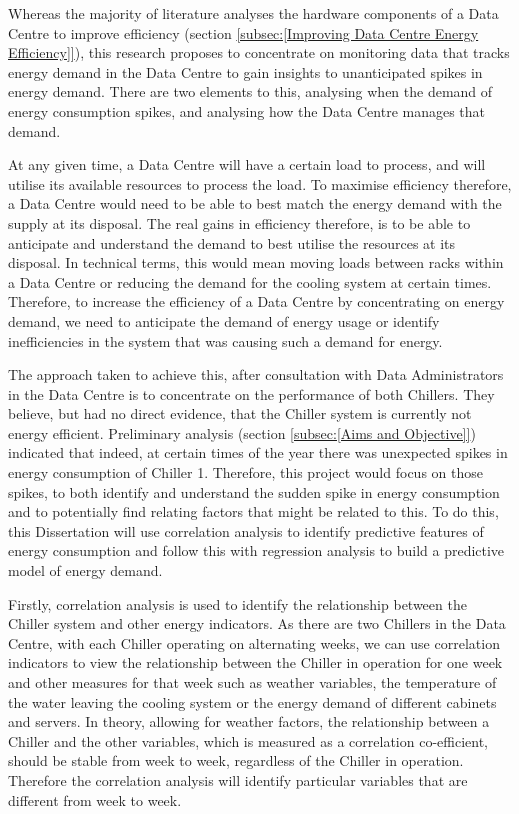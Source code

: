 \documentclass[12pt]{scrartcl}
\begin{document}
 

Whereas the majority of literature analyses the hardware components of a Data Centre to improve efficiency (section \ref{subsec:[Improving Data Centre Energy Efficiency]}), this research proposes to concentrate on monitoring data that tracks energy demand in the Data Centre to gain insights to unanticipated spikes in energy demand. There are two elements to this, analysing when the demand of energy consumption spikes, and analysing how the Data Centre manages that demand. 

 

At any given time, a Data Centre will have a certain load to process, and will utilise its available resources to process the load. To maximise efficiency therefore, a Data Centre would need to be able to best match the energy demand with the supply at its disposal. The real gains in efficiency therefore, is to be able to anticipate and understand the demand to best utilise the resources at its disposal. In technical terms, this would mean moving loads between racks within a Data Centre or reducing the demand for the cooling system at certain times. Therefore, to increase the efficiency of a Data Centre by concentrating on energy demand, we need to anticipate the demand of energy usage or identify inefficiencies in the system that was causing such a demand for energy.

 

The approach taken to achieve this, after consultation with Data Administrators in the Data Centre is to concentrate on the performance of both Chillers. They believe, but had no direct evidence, that the Chiller system is currently not energy efficient. Preliminary analysis (section \ref{subsec:[Aims and Objective]}) indicated that indeed, at certain times of the year there was unexpected spikes in energy consumption of Chiller 1. Therefore, this project would focus on those spikes, to both identify and understand the sudden spike in energy consumption and to potentially find relating factors that might be related to this. To do this, this Dissertation will use correlation analysis to identify predictive features of energy consumption and follow this with regression analysis to build a predictive model of energy demand.

 

Firstly, correlation analysis is used to identify the relationship between the Chiller system and other energy indicators. As there are two Chillers in the Data Centre, with each Chiller operating on alternating weeks, we can use correlation indicators to view the relationship between the Chiller in operation for one week and other measures for that week such as weather variables, the temperature of the water leaving the cooling system or the energy demand of different cabinets and servers. In theory, allowing for weather factors, the relationship between a Chiller and the other variables, which is measured as a correlation co-efficient, should be stable from week to week, regardless of the Chiller in operation. Therefore the correlation analysis will identify particular variables that are different from week to week.
\end{document}
